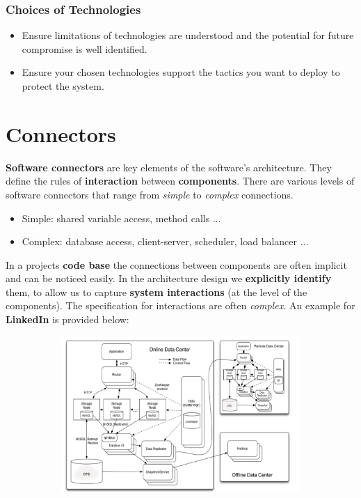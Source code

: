 \documentclass[a4paper]{report}
\begin{document}
\subsection{Choices of Technologies}
\begin{itemize}
\item  Ensure limitations of technologies are understood and the potential for future compromise is well identified.
\item Ensure your chosen technologies support the tactics you want to deploy to protect the system.
\end{itemize}

\chapter{Connectors}
\textbf{Software connectors} are key elements of the software's architecture. They define the rules of \textbf{interaction} between \textbf{components}. There are various levels of software connectors that range from \textit{simple} to \textit{complex} connections.
\begin{itemize}
\item Simple: shared variable access, method calls ...
\item Complex: database access, client-server, scheduler, load balancer ...\\
\end{itemize}

In a projects \textbf{code base} the connections between components are often implicit and can be noticed easily. In the architecture design we \textbf{explicitly identify} them, to allow us to capture \textbf{system interactions} (at the level of the components). The specification for interactions are often \textit{complex.} An example for \textbf{LinkedIn} is provided below:\\

\begin{figure}[H]
\centering
\hskip-2.5cm\begin{subfigure}{1\textwidth}
  \includegraphics[width=1\linewidth]
  {images/10-linked.png}
\end{subfigure}
\end{figure}
\end{document}
